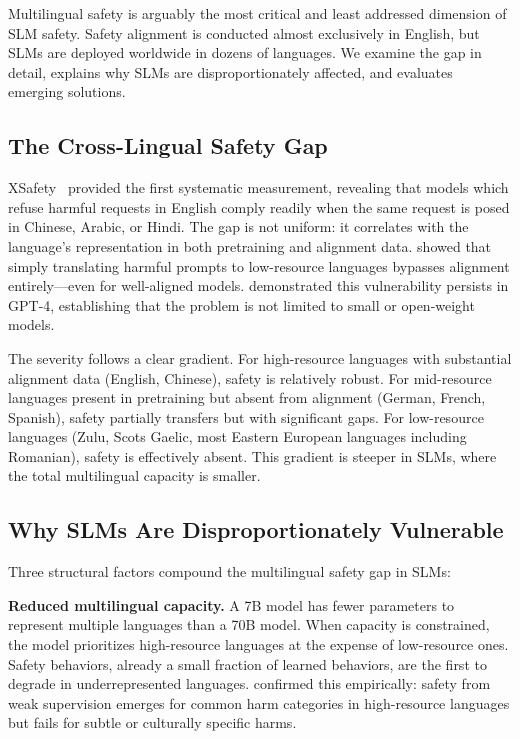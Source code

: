 \documentclass[12pt,a4paper]{article}
\begin{document}
Multilingual safety is arguably the most critical and least addressed dimension of SLM safety. Safety alignment is conducted almost exclusively in English, but SLMs are deployed worldwide in dozens of languages. We examine the gap in detail, explains why SLMs are disproportionately affected, and evaluates emerging solutions.

\subsection{The Cross-Lingual Safety Gap}

XSafety~\citep{wang2024xsafety} provided the first systematic measurement, revealing that models which refuse harmful requests in English comply readily when the same request is posed in Chinese, Arabic, or Hindi. The gap is not uniform: it correlates with the language's representation in both pretraining and alignment data. \citet{deng2024multilingual} showed that simply translating harmful prompts to low-resource languages bypasses alignment entirely---even for well-aligned models. \citet{yong2024lowresource} demonstrated this vulnerability persists in GPT-4, establishing that the problem is not limited to small or open-weight models.

The severity follows a clear gradient. For high-resource languages with substantial alignment data (English, Chinese), safety is relatively robust. For mid-resource languages present in pretraining but absent from alignment (German, French, Spanish), safety partially transfers but with significant gaps. For low-resource languages (Zulu, Scots Gaelic, most Eastern European languages including Romanian), safety is effectively absent. This gradient is steeper in SLMs, where the total multilingual capacity is smaller.

\subsection{Why SLMs Are Disproportionately Vulnerable}

Three structural factors compound the multilingual safety gap in SLMs:

\textbf{Reduced multilingual capacity.} A 7B model has fewer parameters to represent multiple languages than a 70B model. When capacity is constrained, the model prioritizes high-resource languages at the expense of low-resource ones. Safety behaviors, already a small fraction of learned behaviors, are the first to degrade in underrepresented languages. \citet{weaksupervision2026} confirmed this empirically: safety from weak supervision emerges for common harm categories in high-resource languages but fails for subtle or culturally specific harms.
\end{document}
